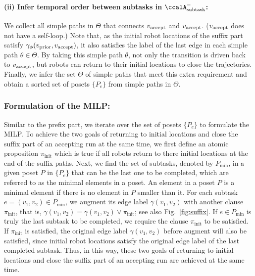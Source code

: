 \documentclass[Afour,sageh,times]{sagej}
\newcommand{\auto}[1]{\ccalA_{\textup{#1}}}
\newcommand{\autop}{\ccalA_{\phi}}
\newcommand{\vertex}[1]{v_{\textup{#1}}}
\newcommand{\ag}[2]{\langle#1,#2\rangle}
\begin{document}
{{{  \paragraph{(ii) Infer temporal order between subtasks in $\auto{subtask}^-$:} We collect all simple paths in $\Theta$ that connects $\vertex{accept}$ and $\vertex{accept}$. ($\vertex{accept}$ does not have a self-loop.) %
 Note that, as the initial robot locations of the suffix part satisfy $\gamma_{\phi}(\vertex{prior}, \vertex{accept})$, it also satisfies the label of the last edge in each simple path $\theta\in \Theta$. By taking this simple path $\theta$, not only the transition is driven back to $\vertex{accept}$, but robots can return to their initial locations to close the trajectories. %
 Finally, we infer the set $\Theta$ of simple paths that meet this extra requirement and  obtain a sorted set of posets $\{P_e\}$ from simple paths in $\Theta$.

  \subsubsection{Formulation of the MILP:}\label{sec:suf_milp} Similar to the prefix part, we iterate over the set of posets $\{P_e\}$ to formulate the MILP.  To achieve the two goals of returning to initial locations and close the suffix part of an accepting run at the same time, we first define an atomic proposition $\pi_{\text{init}}$ which is true if all robots return to there initial locations at the end of the suffix paths. Next, we find the set of subtasks, denoted by $P_{\text{min}}$, in a given poset $P$ in $\{P_e\}$ that can be the last one to be completed, which are referred to as the minimal elements in a poset. An element in a poset $P$  is a minimal element if there is no element in $P$ smaller than it. %
  For each subtask $e = (v_1, v_2) \in P_{\text{min}}$, we augment its edge label $\gamma(v_1, v_2)$ with another clause $\pi_{\text{init}}$, that is, $\gamma(v_1, v_2) = \gamma(v_1, v_2) \vee \pi_{\text{init}}$; see also Fig.~\ref{fig:suffix}. If $e \in P_{\text{min}}$ is truly the last subtask to be completed, we require the clause $ \pi_{\text{init}}$  to be satisfied. If $\pi_{\text{init}}$ is satisfied, the original edge label $\gamma(v_1, v_2)$ before augment will also be satisfied, since initial robot locations satisfy the original edge label of the last completed subtask. Thus, in this way, these two goals of returning to initial locations and close the suffix part of an accepting run are achieved  at the same time.
}}}
\end{document}
